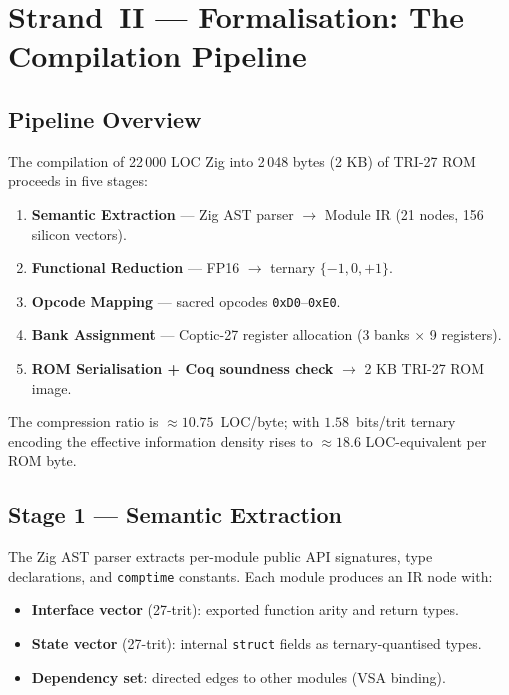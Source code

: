 
\section{Strand~II — Formalisation: The Compilation Pipeline}
\label{sec:flos73-strand2}

\subsection{Pipeline Overview}
\label{ssec:flos73-pipeline}

The compilation of 22\,000 LOC Zig into 2\,048 bytes (2 KB) of TRI-27 ROM
proceeds in five stages:

\begin{enumerate}
  \item \textbf{Semantic Extraction} — Zig AST parser $\to$ Module IR
    (21 nodes, 156 silicon vectors).
  \item \textbf{Functional Reduction} — FP16 $\to$ ternary
    $\{-1, 0, +1\}$.
  \item \textbf{Opcode Mapping} — sacred opcodes \texttt{0xD0}–\texttt{0xE0}.
  \item \textbf{Bank Assignment} — Coptic-27 register allocation
    (3 banks $\times$ 9 registers).
  \item \textbf{ROM Serialisation + Coq soundness check} $\to$ 2 KB TRI-27
    ROM image.
\end{enumerate}

The compression ratio is $\approx 10.75$~LOC/byte; with $1.58$~bits/trit
ternary encoding the effective information density rises to $\approx 18.6$
LOC-equivalent per ROM byte.

\subsection{Stage 1 — Semantic Extraction}
\label{ssec:flos73-stage1}

The Zig AST parser extracts per-module public API signatures, type declarations,
and \texttt{comptime} constants.  Each module produces an IR node with:
\begin{itemize}
  \item \textbf{Interface vector} (27-trit): exported function arity and return
    types.
  \item \textbf{State vector} (27-trit): internal \texttt{struct} fields as
    ternary-quantised types.
  \item \textbf{Dependency set}: directed edges to other modules (VSA binding).
\end{itemize}


